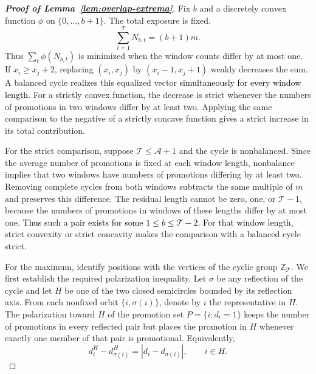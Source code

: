 \label{app:overlap-proof}
\begin{proof}[\normalfont\bfseries Proof of Lemma~\ref{lem:overlap-extrema}]
Fix \(b\) and a discretely convex function \(\phi\) on \(\{0,\ldots,b+1\}\). The total exposure is fixed.
            \[
                \sum_{t=1}^{\mathcal T}N_{b,t}=(b+1)m.
            \]
            Thus \(\sum_t\phi(N_{b,t})\) is minimized when the window counts differ by at most one. If \(x_i\ge x_j+2\), replacing \((x_i,x_j)\) by \((x_i-1,x_j+1)\) weakly decreases the sum. A balanced cycle realizes this equalized vector \textcolor{black}{simultaneously for every window length}. For a strictly convex function, the decrease is strict whenever the numbers of promotions in two windows differ by at least two. Applying the same comparison to the negative of a strictly concave function gives a strict increase in its total contribution.

            For the strict comparison, suppose \(\mathcal T\le\mathcal A+1\) and the cycle is nonbalanced. Since the average number of promotions is fixed at each window length, nonbalance implies that two windows have numbers of promotions differing by at least two. Removing complete cycles from both windows subtracts the same multiple of \(m\) and preserves this difference. The residual length cannot be zero, one, or \(\mathcal T-1\), because the numbers of promotions in windows of these lengths differ by at most one. \textcolor{black}{Thus such a pair exists for some \(1\le b\le\mathcal T-2\). For that window length,} strict convexity or strict concavity makes the comparison with a balanced cycle strict.

            For the maximum, identify positions with the vertices of the cyclic group \(\mathbb Z_{\mathcal T}\). We first establish the required polarization inequality. Let \(\sigma\) be any reflection of the cycle and let \(H\) be one of the two closed semicircles bounded by its reflection axis. From each nonfixed orbit \(\{i,\sigma(i)\}\), denote by \(i\) the representative in \(H\). The polarization toward \(H\) of the promotion set \(P=\{i:d_i=1\}\) keeps the number of promotions in every reflected pair but places the promotion in \(H\) whenever exactly one member of that pair is promotional. Equivalently,
            \[
                d_i^{H}-d_{\sigma(i)}^{H}
                =\left|d_i-d_{\sigma(i)}\right|,
                \qquad i\in H.
            \]


\end{proof}
